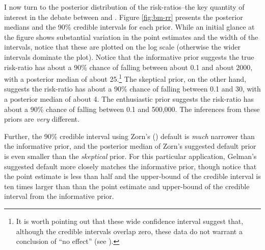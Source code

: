 \documentclass[12pt]{article}
\begin{document}
I now turn to the posterior distribution of the risk-ratios--the key quantity of interest in the debate between \cite{BellMiller2014} and \cite{Rauchhaus2009}. Figure \ref{fig:bm-rr} presents the posterior medians and the 90\% credible intervals for each prior. While an initial glance at the figure shows substantial variation in the point estimates and the width of the intervals, notice that these are plotted on the log scale (otherwise the wider intervals dominate the plot). Notice that the informative prior suggests the true risk-ratio has about a 90\% chance of falling between about 0.1 and about 2000, with a posterior median of about 25.\footnote{It is worth pointing out that these wide confidence interval suggest that, although the credible intervals overlap zero, these data do not warrant a conclusion of ``no effect'' (see \citealt{Rainey2014}).} The skeptical prior, on the other hand, suggests the risk-ratio has about a 90\% chance of falling between 0.1 and 30, with a posterior median of about 4. The enthusiastic prior suggests the risk-ratio has about a 90\% chance of falling between 0.1 and 500,000. The inferences from these priors are \emph{very} different. 

Further, the 90\% credible interval using Zorn's (\citeyear{Zorn2005}) default is \emph{much} narrower than the informative prior, and the posterior median of Zorn's suggested default prior is even smaller than the \emph{skeptical} prior. For this particular application, Gelman's suggested default more closely matches the informative prior, though notice that the point estimate is less than half and the upper-bound of the credible interval is ten times larger than than the point estimate and upper-bound of the credible interval from the informative prior.

\end{document}
